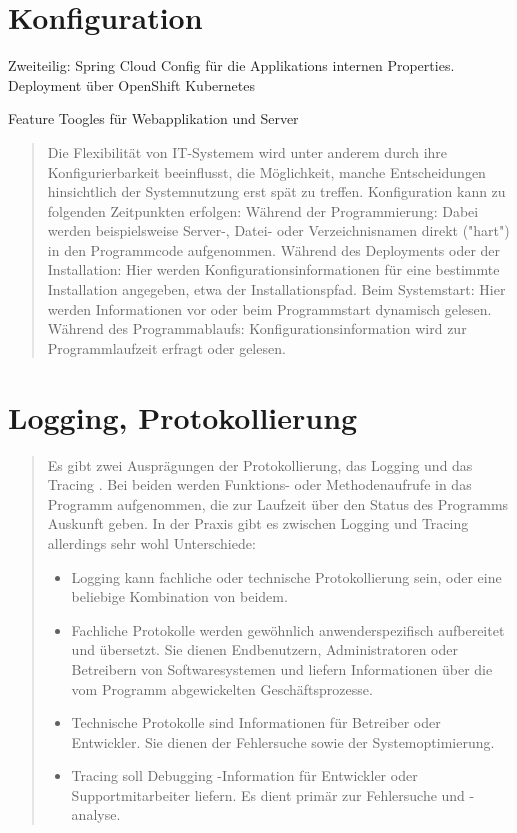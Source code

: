 \section{Konfiguration}

Zweiteilig:
Spring Cloud Config für die Applikations internen Properties.
Deployment über OpenShift Kubernetes

Feature Toogles für Webapplikation und Server

\begin{quote}
	Die Flexibilität von IT-Systemem wird unter anderem durch ihre Konfigurierbarkeit beeinflusst, die Möglichkeit, manche Entscheidungen hinsichtlich der Systemnutzung erst spät zu treffen. Konfiguration kann zu folgenden Zeitpunkten erfolgen:
	Während der Programmierung: Dabei werden beispielsweise Server-, Datei- oder Verzeichnisnamen direkt ("hart") in den Programmcode aufgenommen.
	Während des Deployments oder der Installation: Hier werden Konfigurationsinformationen für eine bestimmte Installation angegeben, etwa der Installationspfad.
	Beim Systemstart: Hier werden Informationen vor oder beim Programmstart dynamisch gelesen.
	Während des Programmablaufs: Konfigurationsinformation wird zur Programmlaufzeit erfragt oder gelesen.
\end{quote}

\section{Logging, Protokollierung}

\begin{quote}
	
	Es gibt zwei Ausprägungen der Protokollierung, das Logging und das Tracing . Bei beiden werden Funktions- oder Methodenaufrufe in das Programm aufgenommen, die zur Laufzeit über den Status des Programms Auskunft geben.
	In der Praxis gibt es zwischen Logging und Tracing allerdings sehr wohl Unterschiede:
	\begin{itemize}
		\item Logging kann fachliche oder technische Protokollierung sein, oder eine beliebige Kombination von beidem.
		\item Fachliche Protokolle werden gewöhnlich anwenderspezifisch aufbereitet und übersetzt. Sie dienen Endbenutzern, Administratoren oder Betreibern von Softwaresystemen und liefern Informationen über die vom Programm abgewickelten Geschäftsprozesse.
		\item Technische Protokolle sind Informationen für Betreiber oder Entwickler. Sie dienen der Fehlersuche sowie der Systemoptimierung.
		\item Tracing soll Debugging -Information für Entwickler oder Supportmitarbeiter liefern. Es dient primär zur Fehlersuche und -analyse.
	\end{itemize}
\end{quote}

